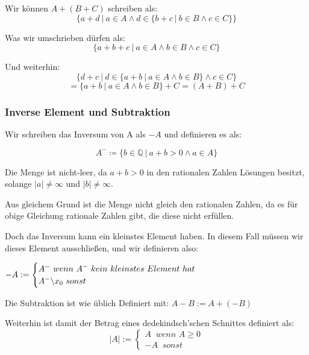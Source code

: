 \documentclass[12pt]{article}
\begin{document}
    Wir können $A + (B + C)$ schreiben als:
    \[\{a+d \mspace{4mu} | \mspace{4mu} a \in A \land d \in \{b + c \mspace{4mu} | \mspace{4mu} b \in B \land c \in C\}\}\]

    Was wir umschrieben dürfen als:
    \[\{a+b+c \mspace{4mu} | \mspace{4mu} a \in A \land b \in B \land c \in C\}\]

    Und weiterhin:
    \[\{d+c \mspace{4mu} | \mspace{4mu} d \in \{a + b \mspace{4mu} | \mspace{4mu} a \in A \land b \in B\} \land c \in C\}\]
    \[= \{a + b \mspace{4mu} | \mspace{4mu} a \in A \land b \in B\} + C = (A + B) + C\]


    \subsubsection{Inverse Element und Subtraktion}

    Wir schreiben das Inversum von A als $-A$ und definieren es als:

    \[A^- \coloneqq \{b \in \mathbb{Q} \mspace{4mu} | \mspace{4mu} a + b > 0 \land a \in A\}\]

    Die Menge ist nicht-leer, da $a + b > 0$ in den rationalen Zahlen Lösungen besitzt, solange $|a| \not = \infty$ und
    $|b| \not = \infty$.

    Aus gleichem Grund ist die Menge nicht gleich den rationalen Zahlen, da es für obige Gleichung rationale Zahlen gibt,
    die diese nicht erfüllen.

    Doch das Inversum kann ein kleinstes Element haben. In diesem Fall müssen wir dieses Element ausschließen,
    und wir definieren also:

    $-A := \begin{cases}A^- \mspace{6mu} wenn \mspace{6mu} A^- \mspace{6mu} kein \mspace{6mu} kleinstes \mspace{6mu} Element \mspace{6mu} hat \\A^- \symbol{'134} {x_0} \mspace{6mu} sonst\end{cases}$

    Die Subtraktion ist wie üblich Definiert mit:
    $A - B := A + (-B)$

    Weiterhin ist damit der Betrag eines dedekindsch'schen Schnittes definiert als:
    \[|A| := \begin{cases}A \mspace{10mu} wenn \mspace{6mu} A \ge 0 \\ -A \mspace{10mu} sonst\end{cases}\]
\end{document}
